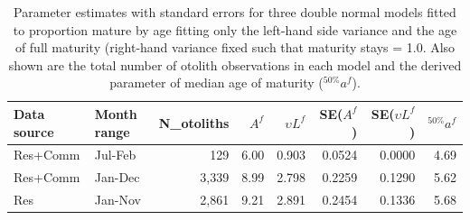 \begin{table}[b]
\centering
\caption{\label{tab:parEst} Parameter estimates with standard errors for three double normal models fitted to proportion mature by age fitting only the left-hand side variance and the age of full maturity (right-hand variance fixed such that maturity stays = 1.0. Also shown are the total number of otolith observations in each model and the derived parameter of median age of maturity ($^{50\%}a^f$).}
\begin{tabular}{llrrrrrr}
\hline
Data source & Month range & N\_otoliths & $A^f$ & ${\upsilon}L^f$ & SE($A^f$) & SE(${\upsilon}L^f$) & $^{50\%}a^f$ \\
\hline
Res+Comm    &     Jul-Feb &         129 &  6.00 &         0.903 &   0.0524 &            0.0000 &       4.69 \\
Res+Comm    &     Jan-Dec &       3,339 &  8.99 &         2.798 &   0.2259 &            0.1290 &       5.62 \\
Res         &     Jan-Nov &       2,861 &  9.21 &         2.891 &   0.2454 &            0.1336 &       5.68 \\
\hline
\end{tabular}
\end{table}

\clearpage
